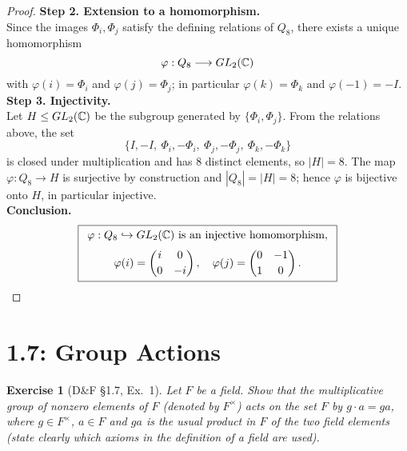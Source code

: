 \documentclass[12pt]{article}
\newtheorem{exercise}[theorem]{Exercise}
\theoremstyle{definition}
\begin{document}
\begin{proof}
\noindent\textbf{Step 2. Extension to a homomorphism.}\\
\noindent Since the images $\Phi_i,\Phi_j$ satisfy the defining relations of $Q_8$, there exists a unique homomorphism
\[
\varphi:Q_8\longrightarrow GL_2(\Bbb C)
\]
with $\varphi(i)=\Phi_i$ and $\varphi(j)=\Phi_j$; in particular $\varphi(k)=\Phi_k$ and $\varphi(-1)=-I$.\\

\noindent\textbf{Step 3. Injectivity.}\\
\noindent Let $H\le GL_2(\Bbb C)$ be the subgroup generated by $\{\Phi_i,\Phi_j\}$.  
From the relations above, the set
\[
\{I,-I,\ \Phi_i,-\Phi_i,\ \Phi_j,-\Phi_j,\ \Phi_k,-\Phi_k\}
\]
is closed under multiplication and has $8$ distinct elements, so $|H|=8$.  
The map $\varphi:Q_8\to H$ is surjective by construction and $|Q_8|=|H|=8$; hence $\varphi$ is bijective onto $H$, in particular injective.\\

\noindent\textbf{Conclusion.}
\[
\boxed{
\begin{array}{c}
\varphi:Q_8\hookrightarrow GL_2(\Bbb C)\ \text{is an injective homomorphism},\\[6pt]
\varphi(i)=\begin{pmatrix}i&0\\[2pt]0&-i\end{pmatrix},\quad
\varphi(j)=\begin{pmatrix}0&-1\\[2pt]1&0\end{pmatrix}.
\end{array}
}
\]

\end{proof}


\newpage

\dotfill
\section*{1.7: Group Actions}
\dotfill

\newpage

\begin{exercise}[D\&F §1.7, Ex.~1]
Let $F$ be a field. Show that the multiplicative group of nonzero elements of $F$
(denoted by $F^\times$) acts on the set $F$ by $g\cdot a=ga$, where $g\in F^\times$, $a\in F$
and $ga$ is the usual product in $F$ of the two field elements \emph{(state clearly which axioms
in the definition of a field are used)}.
\end{exercise}
\end{document}
